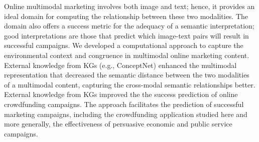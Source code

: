 Online multimodal marketing 
involves both image and text; hence, it provides an ideal domain for computing the relationship between these two modalities.  The domain also offers a success metric for the adequacy of a semantic interpretation; good interpretations are those that predict which image-text pairs will result in successful campaigns.
We developed a computational approach to capture the environmental context and congruence in multimodal online marketing content.
External knowledge from KGs (e.g., ConceptNet)  enhanced the multimodal representation that %
decreased the semantic distance between the two modalities of a multimodal content, capturing the cross-modal semantic relationships better. External knowledge from KGs improved the 
the success prediction of online crowdfunding campaigns. The approach facilitates the prediction of successful marketing campaigns, including the crowdfunding application studied here and more generally, the effectiveness of persuasive economic and public service campaigns.



